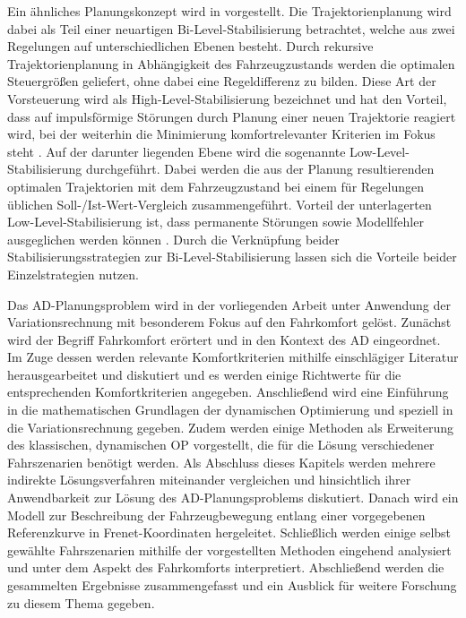 Ein ähnliches Planungskonzept wird in \cite{Werling.2011} vorgestellt. Die Trajektorienplanung wird dabei als Teil einer neuartigen Bi-Level-Stabilisierung betrachtet, welche aus zwei Regelungen auf unterschiedlichen Ebenen besteht. Durch rekursive Trajektorienplanung in Abhängigkeit des Fahrzeugzustands werden die optimalen Steuergrößen geliefert, ohne dabei eine Regeldifferenz zu bilden. Diese Art der Vorsteuerung wird als High-Level-Stabilisierung bezeichnet und hat den Vorteil, dass auf impulsförmige Störungen durch Planung einer neuen Trajektorie reagiert wird, bei der weiterhin die Minimierung komfortrelevanter Kriterien im Fokus steht \cite{Werling.2011}. Auf der darunter liegenden Ebene wird die sogenannte Low-Level-Stabilisierung durchgeführt. Dabei werden die aus der Planung resultierenden optimalen Trajektorien mit dem Fahrzeugzustand bei einem für Regelungen üblichen Soll-/Ist-Wert-Vergleich zusammengeführt. Vorteil der unterlagerten Low-Level-Stabilisierung ist, dass permanente Störungen sowie Modellfehler ausgeglichen werden können \cite{Werling.2011}. Durch die Verknüpfung beider Stabilisierungsstrategien zur Bi-Level-Stabilisierung lassen sich die Vorteile beider Einzelstrategien nutzen.   

Das \gls{AD}-Planungsproblem wird in der vorliegenden Arbeit unter Anwendung der Variationsrechnung mit besonderem Fokus auf den Fahrkomfort gelöst. Zunächst wird der Begriff Fahrkomfort erörtert und in den Kontext des \gls{AD} eingeordnet. Im Zuge dessen werden relevante Komfortkriterien mithilfe einschlägiger Literatur herausgearbeitet und diskutiert und es werden einige Richtwerte für die entsprechenden Komfortkriterien angegeben. Anschließend wird eine Einführung in die mathematischen Grundlagen der dynamischen Optimierung und speziell in die Variationsrechnung gegeben. Zudem werden einige Methoden als Erweiterung des \glqq klassischen\grqq, dynamischen \gls{OP} vorgestellt, die für die Lösung verschiedener Fahrszenarien benötigt werden. Als Abschluss dieses Kapitels werden mehrere indirekte Lösungsverfahren miteinander vergleichen und hinsichtlich ihrer Anwendbarkeit zur Lösung des \gls{AD}-Planungsproblems diskutiert. Danach wird ein Modell zur Beschreibung der Fahrzeugbewegung entlang einer vorgegebenen Referenzkurve in Frenet-Koordinaten hergeleitet. Schließlich werden einige selbst gewählte Fahrszenarien mithilfe der vorgestellten Methoden eingehend analysiert und unter dem Aspekt des Fahrkomforts interpretiert. Abschließend werden die gesammelten Ergebnisse zusammengefasst und ein Ausblick für weitere Forschung zu diesem Thema gegeben. 

